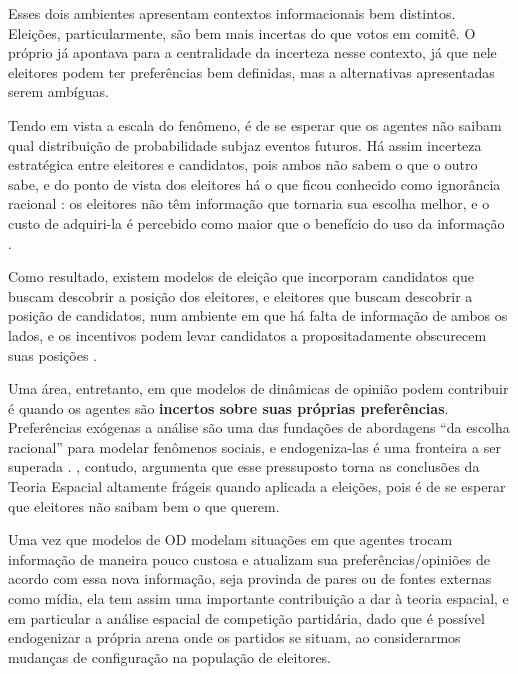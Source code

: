 Esses dois ambientes apresentam contextos informacionais bem distintos.
Eleições, particularmente, são bem mais incertas do que votos em comitê. O
próprio  já apontava para a centralidade da
incerteza nesse contexto, já que nele eleitores podem ter preferências bem
definidas, mas a alternativas apresentadas serem ambíguas.

Tendo em vista a  escala do fenômeno, é de se esperar que os agentes não saibam qual
distribuição de probabilidade subjaz eventos futuros. Há assim incerteza
estratégica entre eleitores e candidatos, pois ambos não sabem o que o outro
sabe, e do ponto de vista dos eleitores há o que ficou conhecido como ignorância
racional : os eleitores não têm informação que tornaria sua escolha melhor, e o
custo de adquiri-la é percebido como maior que o benefício do uso da informação
\cite{munger2015choosing}.

Como resultado, existem modelos de eleição que incorporam candidatos que buscam
descobrir a posição dos eleitores, e eleitores que buscam descobrir a posição de
candidatos, num ambiente em que há falta de informação de ambos os lados, e os
incentivos podem levar candidatos a propositadamente obscurecem suas posições
\cite{downs1957economic}.

Uma área, entretanto, em que modelos de dinâmicas de opinião podem contribuir é
quando os agentes são \textbf{incertos sobre suas próprias preferências}.
Preferências exógenas a análise são uma das fundações de abordagens ``da escolha
racional'' para modelar fenômenos sociais, e endogeniza-las é uma fronteira a
ser superada \cite{gintis2009bounds,bowles2009microeconomics}.
, contudo, argumenta que esse pressuposto torna
as conclusões da Teoria Espacial altamente frágeis quando aplicada a eleições,
pois é de se esperar que eleitores não saibam bem o que querem.

Uma vez que modelos de OD modelam situações em que agentes trocam informação de
maneira pouco custosa e atualizam sua preferências/opiniões de acordo com essa
nova informação, seja provinda de pares ou de fontes externas como mídia, ela
tem assim uma importante contribuição a dar à teoria espacial, e em particular a
análise espacial de competição partidária, dado que é possível endogenizar a
própria arena onde os partidos se situam, ao considerarmos mudanças de
configuração na população de eleitores.




